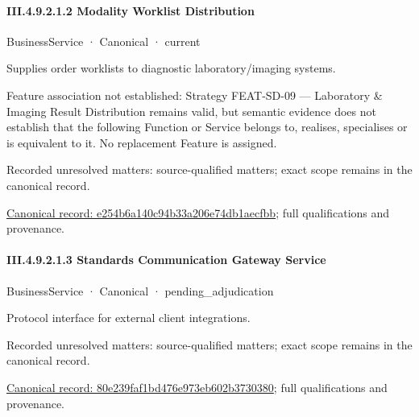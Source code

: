 \paragraph*{III.4.9.2.1.2 Modality Worklist Distribution}
\label{navigation:III.4.9.2.1.2}

\label{element:e254b6a140c94b33a206e74db1aecfbb}
{\small BusinessService · Canonical · current}\par

Supplies order worklists to diagnostic laboratory/imaging systems.



Feature association not established: Strategy FEAT-SD-09 — Laboratory \& Imaging Result Distribution remains valid, but semantic evidence does not establish that the following Function or Service belongs to, realises, specialises or is equivalent to it. No replacement Feature is assigned.


{\small Recorded unresolved matters: source-qualified matters; exact scope remains in the canonical record.}\par
{\footnotesize \href{../../../../../../../../continuum/business/business-service/e254b6a140c94b33a206e74db1aecfbb.md}{Canonical record: e254b6a140c94b33a206e74db1aecfbb}; full qualifications and provenance.}\par
\paragraph*{III.4.9.2.1.3 Standards Communication Gateway Service}
\label{navigation:III.4.9.2.1.3}

\label{element:80e239faf1bd476e973eb602b3730380}
{\small BusinessService · Canonical · pending\_adjudication}\par

Protocol interface for external client integrations.


{\small Recorded unresolved matters: source-qualified matters; exact scope remains in the canonical record.}\par
{\footnotesize \href{../../../../../../../../continuum/business/business-service/80e239faf1bd476e973eb602b3730380.md}{Canonical record: 80e239faf1bd476e973eb602b3730380}; full qualifications and provenance.}\par
